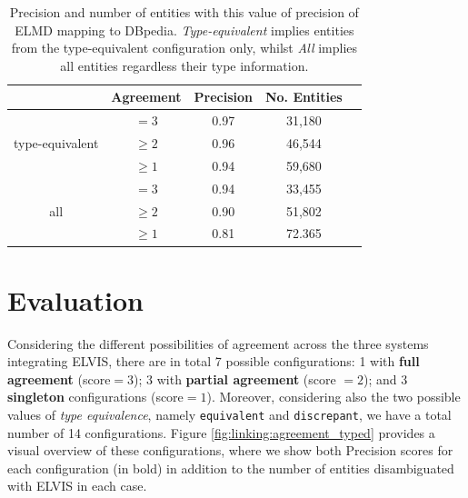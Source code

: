 \begin{table}[]
\centering
\def\arraystretch{1.2}
	\begin{tabular}{ c  c  c  c  c }
\hline
 & \textbf{Agreement} & \textbf{Precision} & \textbf{No. Entities} \\
\hline
\multirow{3}{*}{type-equivalent} & $=3$ & 0.97 & 31,180\\
&$\geq2$ & 0.96 & 46,544 \\
&$\geq1$ & 0.94 & 59,680 \\
\hline
\multirow{3}{*}{all} & $=3$ & 0.94 & 33,455\\
&$\geq2$ & 0.90 & 51,802\\
&$\geq1$ & 0.81 & 72.365\\
\hline
	\end{tabular}
	\caption[Precision and coverage of ELMD mapping to DBpedia.]{Precision and number of entities with this value of precision of ELMD mapping to DBpedia. \textit{Type-equivalent} implies entities from the type-equivalent configuration only, whilst \textit{All} implies all entities regardless their type information.}
	\label{tbl:linking:results}
\end{table}

\section{Evaluation}
\label{sec:linking:eval}

Considering the different possibilities of agreement across the three systems integrating \textsc{ELVIS}, there are in total 7 possible configurations: 1 with \textbf{full agreement} (score$=3$); 3 with \textbf{partial agreement} (score $=2$); and 3 \textbf{singleton} configurations (score$=1$). Moreover, considering also the two possible values of \textit{type equivalence}, namely \texttt{equivalent} and \texttt{discrepant}, we have a total number of 14 configurations. Figure \ref{fig:linking:agreement_typed} provides a visual overview of these configurations, where we show both Precision scores for each configuration (in bold) in addition to the number of entities disambiguated with \textsc{ELVIS} in each case.


